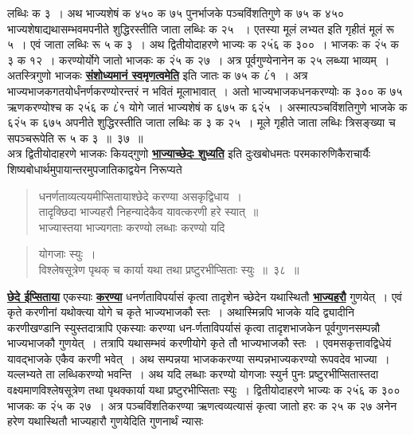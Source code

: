 \documentclass[11pt, openany]{book}
\begin{document}
{{लब्धिः क ३~। अथ भाज्यशेषं क ४५० क ७५ पुनर्भाजके पञ्चविंशतिगुणे क ७५ 
क ४५० भाज्यशेषाद्यथासम्भवमपनीते शुद्धिरस्तीति जाता लब्धिः क २५ ~। एतस्या 
मूलं लभ्यत इति गृहीतं मूलं रू ५~। एवं जाता लब्धिः रू ५ क ३~। अथ 
द्वितीयोदाहरणे भाज्यः क २५ं६ क ३००~। भाजकः क २ं५ क ३ क 
१२~। करण्योर्योगे जातो भाजकः क २ं५ क २७~। अत्र पूर्वगुण्येनानेन क २५
लब्ध्या भाव्यम्~। अतस्त्रिगुणो भाजकः \hyperref[7]{\textbf{संशोध्यमानं स्वमृणत्वमेति}} इति
जातः क ७५ क ८ं१~। अत्र भाज्यभाजकगतयोर्धंनर्णकरण्योरन्तरं न भवितं
मूलाभावात्~। अतो भाज्यभाजकधनकरण्योः क ३०० क ७५ ऋणकरण्योश्च क २५ं६ क ८ं१
योगे जातं भाज्यशेषं क ६७५ क ६२ं५~। अस्मात्पञ्चविंशतिगुणे भाजके क ६२ं५ क ६७५
अपनीते शुद्धिरस्तीति जाता लब्धिः क ३ क २५~। मूले गृहीते जाता लब्धिः
त्रिसङ्ख्या च सपञ्चरूपेति रू ५ क ३~॥~३७~॥\\

\vspace{-3mm}
 अत्र द्वितीयोदाहरणे भाजकः कियद्गुणो \hyperref[29]{\textbf{भाज्याच्छेदः शुध्यति}} इति
दुःखबोधमतः परमकारुणिकैराचार्यैः शिष्यबोधार्थमुपायान्तरमुपजातिकाद्वयेन
निरूप्यते\textendash 

 \label{38}
\begin{quote}
    \ab 
    धनर्णताव्यत्ययमीप्सितायाश्छेदे करण्या असकृद्विधाय~। \\
तादृक्छिदा भाज्यहरौ निहन्यादेकैव यावत्करणी हरे स्यात्~॥\\
भाज्यास्तया भाज्यगताः करण्यो लब्धाः करण्यो यदि
\end{quote}
\newpage
\begin{quote}
    \ab 
    योगजाः स्युः~।\\
विश्लेषसूत्रेण पृथक् च कार्या यथा तथा प्रष्टुरभीप्सिताः स्युः~॥~३८~॥
\end{quote}

\hyperref[38]{\textbf{छेदे ईप्सिताया}} एकस्याः \hyperref[38]{\textbf{करण्या}} धनर्णताविपर्यासं कृत्वा तादृशेन
च्छेदेन यथास्थितौ \hyperref[38]{\textbf{भाज्यहरौ}} गुणयेत्~। एवं कृते करणीनां यथोक्त्या योगे च कृते
भाज्यभाजकौ स्तः~। अथास्मिन्नपि भाजके यदि द्व्यादीनि करणीखण्डानि
स्युस्तदात्रापि एकस्याः करण्या धन-र्णताविपर्यासं कृत्वा तादृशभाजकेन
पूर्वगुणनसम्पन्नौ भाज्यभाजकौ गुणयेत्~। तत्रापि यथासम्भवं करणीयोगे कृते तौ
भाज्यभाजकौ स्तः~। एवमसकृत्तावद्विधेयं यावद्भाजके एकैव करणी भवेत्~। अथ
सम्पन्नया भाजककरण्या सम्पन्नभाज्यकरण्यो रूपवदेव भाज्या~। यल्लभ्यते
ता लब्धिकरण्यो भवन्ति~। अथ यदि लब्धाः करण्यो योगजाः स्युर्न पुनः
प्रष्टुरभीप्सितास्तदा वक्ष्यमाणविश्लेषसूत्रेण तथा पृथक्कार्या यथा
प्रष्टुरभीप्सिताः स्युः~। द्वितीयोदाहरणे भाज्यः क २५ं६ क ३०० भाजकः क
२ं५ क २७~। अत्र पञ्चविंशतिकरण्या ऋणत्वव्यत्यासं कृत्वा जातो हरः क २५
क २७ अनेन हरेण यथास्थितौ भाज्यहारौ गुणयेदिति गुणनार्थं न्यासः\\
\vspace{-3mm}

}}
\end{document}
